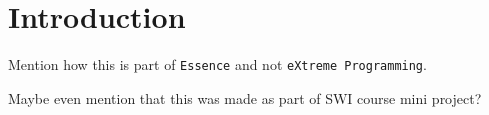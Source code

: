 \section{Introduction}
Mention how this is part of \texttt{Essence} and not \texttt{eXtreme Programming}.

Maybe even mention that this was made as part of SWI course mini project?